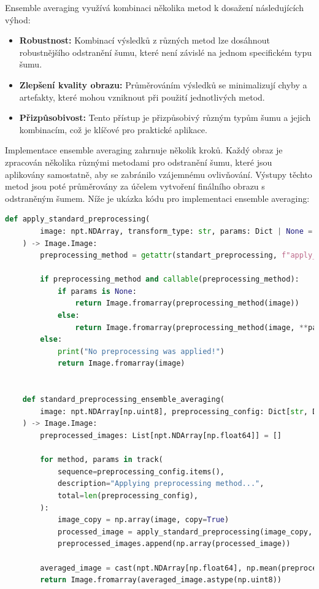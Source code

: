 \documentclass[male,czech,api_ing]{thesis}
\begin{document}
Ensemble averaging využívá kombinaci několika metod k dosažení následujících výhod:

\begin{itemize}
    \item \textbf{Robustnost:} Kombinací výsledků z různých metod lze dosáhnout robustnějšího odstranění šumu, které není závislé na jednom specifickém typu šumu.
    \item \textbf{Zlepšení kvality obrazu:} Průměrováním výsledků se minimalizují chyby a artefakty, které mohou vzniknout při použití jednotlivých metod.
    \item \textbf{Přizpůsobivost:} Tento přístup je přizpůsobivý různým typům šumu a jejich kombinacím, což je klíčové pro praktické aplikace.
\end{itemize}

Implementace ensemble averaging zahrnuje několik kroků. Každý obraz je zpracován několika různými metodami pro odstranění šumu, které jsou aplikovány samostatně, aby se zabránilo vzájemnému ovlivňování. Výstupy těchto metod jsou poté průměrovány za účelem vytvoření finálního obrazu s odstraněným šumem. Níže je ukázka kódu pro implementaci ensemble averaging:

\begin{lstlisting}[language=Python, caption={Implementace Ensemble Averaging metody}, label={lst:ensemble_averaging}]
    def apply_standard_preprocessing(
        image: npt.NDArray, transform_type: str, params: Dict | None = None
    ) -> Image.Image:
        preprocessing_method = getattr(standart_preprocessing, f"apply_{transform_type}")

        if preprocessing_method and callable(preprocessing_method):
            if params is None:
                return Image.fromarray(preprocessing_method(image))
            else:
                return Image.fromarray(preprocessing_method(image, **params))
        else:
            print("No preprocessing was applied!")
            return Image.fromarray(image)


    def standard_preprocessing_ensemble_averaging(
        image: npt.NDArray[np.uint8], preprocessing_config: Dict[str, Dict[str, Any]]
    ) -> Image.Image:
        preprocessed_images: List[npt.NDArray[np.float64]] = []

        for method, params in track(
            sequence=preprocessing_config.items(),
            description="Applying preprocessing method...",
            total=len(preprocessing_config),
        ):
            image_copy = np.array(image, copy=True)
            processed_image = apply_standard_preprocessing(image_copy, method, params)
            preprocessed_images.append(np.array(processed_image))

        averaged_image = cast(npt.NDArray[np.float64], np.mean(preprocessed_images, axis=0))
        return Image.fromarray(averaged_image.astype(np.uint8))
\end{lstlisting}
\end{document}
